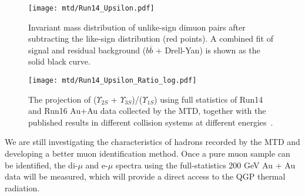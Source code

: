 \begin{figure}[htbp]
\begin{minipage}[htbp]{0.48\linewidth}
\centering
\texttt{[image: mtd/Run14\_Upsilon.pdf]}
\caption{ Invariant mass distribution of unlike-sign dimuon pairs after subtracting the like-sign distribution (red points).
A combined fit of signal and residual background ($b\overline{b}$ + Drell-Yan) is shown as the solid black curve.\label{upsilonviamumu}}
\end{minipage}
\hfill
\begin{minipage}[htbp]{0.48\linewidth}
\centering
\texttt{[image: mtd/Run14\_Upsilon\_Ratio\_log.pdf]} 
\caption{The projection of ($\varUpsilon_{2S}$ + $\varUpsilon_{3S}$)/($\varUpsilon_{1S}$) using full statistics of Run14 and Run16 Au+Au data collected by the MTD, together with the published results in different collision systems at different energies~\cite{UpsilonWorldwide, UpsilonSTAR, UpsilonCMS}.\label{upsilonproj}}
\end{minipage}
\end{figure}

We are still investigating the characteristics of hadrons recorded by the MTD and developing a better muon identification method. Once a pure muon sample can be identified, the di-$\mu$ and e-$\mu$ spectra using the full-statistics 200 GeV Au + Au data will be measured, which will provide a direct access to the QGP thermal radiation.



